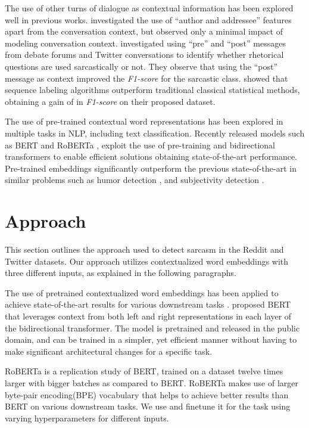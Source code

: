 \documentclass[11pt,a4paper]{article}
\begin{document}
The use of other turns of dialogue as contextual information has been explored well in previous works. \citet{Bamman-Smith-2015} investigated the use of “author and addressee” features apart from the conversation context, but observed only a minimal impact of modeling conversation context. \citet{oraby-et-al-2017} investigated using “pre” and “post” messages from debate forums and Twitter conversations to identify whether rhetorical questions are used sarcastically or not. They observe that using the “post” message as context improved the \textit{F1-score} for the sarcastic class. \citet{joshi-etal-2016-harnessing} showed that sequence labeling algorithms outperform traditional classical statistical methods, obtaining a gain of  in \textit{F1-score} on their proposed dataset.

The use of pre-trained contextual word representations has been explored in multiple tasks in NLP, including text classification. Recently released models such as BERT \cite{Devlin2019} and RoBERTa \cite{2020roberta}, exploit the use of pre-training and bidirectional transformers to enable efficient solutions obtaining state-of-the-art performance. Pre-trained embeddings significantly outperform the previous state-of-the-art in similar problems such as humor detection \citep{Weller2019HumorDA}, and subjectivity detection \citep{subjective-detection}.

\section{Approach}
This section outlines the approach used to detect sarcasm in the Reddit and Twitter datasets. Our approach utilizes contextualized word embeddings with three different inputs, as explained in the following paragraphs. 

The use of pretrained contextualized word embeddings has been applied to achieve state-of-the-art results for various downstream tasks \cite{Devlin2019,2020roberta}. \citet{Devlin2019} proposed BERT that leverages context from both left and right representations in each layer of the bidirectional transformer. The model is pretrained and released in the public domain, and can be trained in a simpler, yet efficient manner without having to make significant architectural changes for a specific task.  

RoBERTa \citep{2020roberta} is a replication study of BERT, trained on a dataset twelve times larger with bigger batches as compared to BERT. RoBERTa makes use of larger byte-pair encoding(BPE) vocabulary that helps to achieve better results than BERT on various downstream tasks. We use  and finetune it for the task using varying hyperparameters for different inputs.
\end{document}
